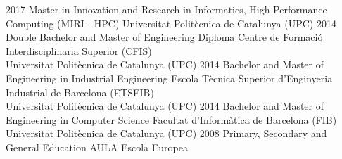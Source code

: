 %
%
%


\vspace{1em}

\begin{scholarship}
    \scholarshipentry
        {2017}
        {Master in Innovation and Research in Informatics, High Performance Computing (MIRI - HPC)}
        {Universitat Politècnica de Catalunya (UPC)}
    \scholarshipentry
        {2014}
        {Double Bachelor and Master of Engineering Diploma}
        {Centre de Formació Interdisciplinaria Superior (CFIS) \\ Universitat Politècnica de Catalunya (UPC)}
    \scholarshipentry
        {2014}
        {Bachelor and Master of Engineering in Industrial Engineering}
        {Escola Tècnica Superior d'Enginyeria Industrial de Barcelona (ETSEIB) \\ Universitat Politècnica de Catalunya (UPC)}
    \scholarshipentry
        {2014}
        {Bachelor and Master of Engineering in Computer Science}
        {Facultat d'Informàtica de Barcelona (FIB) \\ Universitat Politècnica de Catalunya (UPC)}
    \scholarshipentry
        {2008}
        {Primary, Secondary and General Education}
        {AULA Escola Europea}
\end{scholarship}